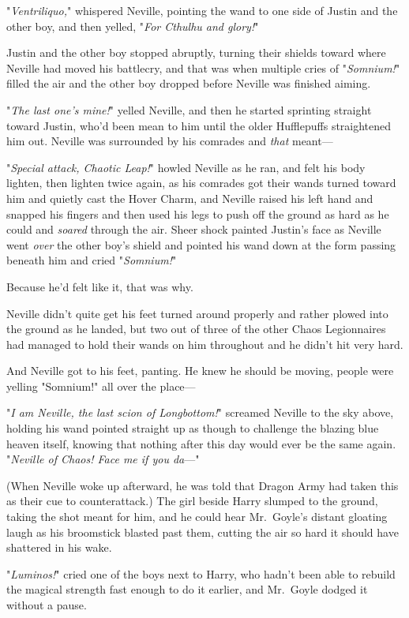 "\emph{Ventriliquo,}" whispered Neville, pointing the wand to one side of
Justin and the other boy, and then yelled, "\emph{For Cthulhu and glory!}"

Justin and the other boy stopped abruptly, turning their shields toward where
Neville had moved his battlecry, and that was when multiple cries of
"\emph{Somnium!}" filled the air and the other boy dropped before Neville was
finished aiming.

"\emph{The last one's mine!}" yelled Neville, and then he started sprinting
straight toward Justin, who'd been mean to him until the older Hufflepuffs
straightened him out. Neville was surrounded by his comrades and \emph{that}
meant---

"\emph{Special attack, Chaotic Leap!}" howled Neville as he ran, and felt his
body lighten, then lighten twice again, as his comrades got their wands turned
toward him and quietly cast the Hover Charm, and Neville raised his left hand
and snapped his fingers and then used his legs to push off the ground as hard
as he could and \emph{soared} through the air. Sheer shock painted Justin's
face as Neville went \emph{over} the other boy's shield and pointed his wand
down at the form passing beneath him and cried "\emph{Somnium!}"

Because he'd felt like it, that was why.

Neville didn't quite get his feet turned around properly and rather plowed into
the ground as he landed, but two out of three of the other Chaos Legionnaires
had managed to hold their wands on him throughout and he didn't hit very hard.

And Neville got to his feet, panting. He knew he should be moving, people were
yelling "Somnium!" all over the place---

"\emph{I am Neville, the last scion of Longbottom!}" screamed Neville to the
sky above, holding his wand pointed straight up as though to challenge the
blazing blue heaven itself, knowing that nothing after this day would ever be
the same again. "\emph{Neville of Chaos! Face me if you da}\mbox{---}"

(When Neville woke up afterward, he was told that Dragon Army had taken this as
their cue to counterattack.)
\sbreak
The girl beside Harry slumped to the ground, taking the shot meant for him, and
he could hear Mr.~Goyle's distant gloating laugh as his broomstick blasted past
them, cutting the air so hard it should have shattered in his wake.

"\emph{Luminos!}" cried one of the boys next to Harry, who hadn't been able to
rebuild the magical strength fast enough to do it earlier, and Mr.~Goyle dodged
it without a pause.

